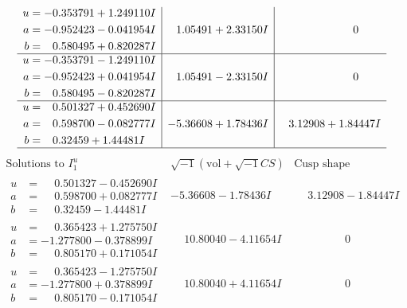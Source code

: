 \documentclass[1p]{elsarticle_modified}
\theoremstyle{definition}
\newcommand{\I}{\sqrt{-1}}
\begin{document}
$$\begin{array}{c|c|c}
\begin{aligned}
u &= -0.353791 + 1.249110 I \\
a &= -0.952423 - 0.041954 I \\
b &= \phantom{-}0.580495 + 0.820287 I\end{aligned}
 & \phantom{-}1.05491 + 2.33150 I & \phantom{-0.000000 } 0 \\ \hline\begin{aligned}
u &= -0.353791 - 1.249110 I \\
a &= -0.952423 + 0.041954 I \\
b &= \phantom{-}0.580495 - 0.820287 I\end{aligned}
 & \phantom{-}1.05491 - 2.33150 I & \phantom{-0.000000 } 0 \\ \hline\begin{aligned}
u &= \phantom{-}0.501327 + 0.452690 I \\
a &= \phantom{-}0.598700 - 0.082777 I \\
b &= \phantom{-}0.32459 + 1.44481 I\end{aligned}
 & -5.36608 + 1.78436 I & \phantom{-}3.12908 + 1.84447 I\\
 \hline 
 \end{array}$$\newpage$$\begin{array}{c|c|c}  
\text{Solutions to }I^u_{1}& \I (\text{vol} + \sqrt{-1}CS) & \text{Cusp shape}\\
 \hline 
\begin{aligned}
u &= \phantom{-}0.501327 - 0.452690 I \\
a &= \phantom{-}0.598700 + 0.082777 I \\
b &= \phantom{-}0.32459 - 1.44481 I\end{aligned}
 & -5.36608 - 1.78436 I & \phantom{-}3.12908 - 1.84447 I \\ \hline\begin{aligned}
u &= \phantom{-}0.365423 + 1.275750 I \\
a &= -1.277800 - 0.378899 I \\
b &= \phantom{-}0.805170 + 0.171054 I\end{aligned}
 & \phantom{-}10.80040 - 4.11654 I & \phantom{-0.000000 } 0 \\ \hline\begin{aligned}
u &= \phantom{-}0.365423 - 1.275750 I \\
a &= -1.277800 + 0.378899 I \\
b &= \phantom{-}0.805170 - 0.171054 I\end{aligned}
 & \phantom{-}10.80040 + 4.11654 I & \phantom{-0.000000 } 0 \\ \hline\begin{aligned}

\end{aligned}
\end{array}$$
\end{document}
